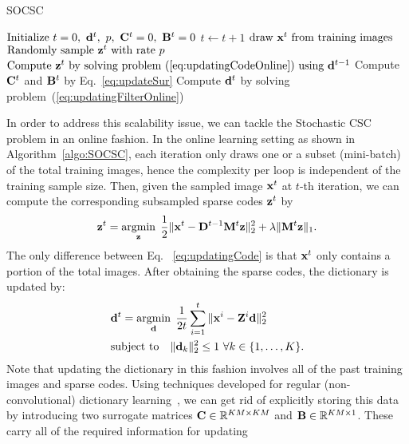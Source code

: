 \begin{algorithm}[H]
\caption{SOCSC} \label{algo:SOCSC}
\begin{algorithmic}[1]
\State $\text{Initialize} ~ t=0, ~\filter^t, ~p, ~\surC^t = 0, ~\surB^t = 0$
    \State $t \gets t+1$
    \State $ \text{draw } \signal^t \text{ from training images} $
    \State $ \text{Randomly sample }\code^t \text{ with rate } p $
    \State $ \text{Compute } \code^t \text{ by solving problem~(\ref{eq:updatingCodeOnline}) using } \filter^{t-1}$
    \State Compute $\surC^t$ and $\surB^t$ by Eq.~\ref{eq:updateSur}
    \State Compute $\filter^t$ by solving problem~(\ref{eq:updatingFilterOnline})
\EndWhile
\end{algorithmic}
\end{algorithm}

In order to address this scalability issue, we can tackle the
Stochastic CSC problem in an online fashion. In the online learning
setting as shown in Algorithm~\ref{algo:SOCSC}, each iteration only
draws one or a subset (mini-batch) of the total training images, hence
the complexity per loop is independent of the training sample
size. Then, given the sampled image $\signal^t$ at $t$-th iteration,
we can compute the corresponding subsampled sparse codes $\code^t$ by
\begin{equation} \label{eq:updatingCodeOnline}
    \code^t = \minimize{\code} \frac{1}{2}\|\signal^t - \Filter^{t-1}\mask^t \code \|_2^2 + \lambda \|\mask^t \code\|_1.
\end{equation}
The only difference between Eq. ~\ref{eq:updatingCode} is that $\signal^t$ only contains a portion of the total images. After obtaining
the sparse codes, the dictionary is updated by:
\begin{equation}
\begin{split}
    &\filter^t = \minimize{\filter} \frac{1}{2t}\sum_{i=1}^{t} \|\signal^i - \Code^i \filter \|_2^2 \\
    &\text{subject to} \quad \|\filter_k\|^2_2 \leq 1 ~ \forall k \in \{1,\dots,K\}.
\end{split}
\end{equation}
Note that updating the dictionary in this fashion involves all of the
past training images and sparse codes. Using techniques developed for
regular (non-convolutional) dictionary
learning~\cite{mairal2009online,mairal2010online}, we can get rid of
explicitly storing this data by introducing two surrogate matrices
$\surC \in \mathbb{R}^{KM \times KM}$ and $\surB \in \mathbb{R}^{KM
  \times 1}$. These carry all of the required information for updating
